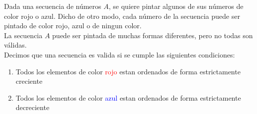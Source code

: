 Dada una secuencia de números $A$, se quiere pintar algunos de sus números de color rojo o azul. Dicho de otro modo, cada número de la secuencia puede ser pintado de color rojo, azul o de ningun color. \\

La secuencia $A$ puede ser pintada de muchas formas diferentes, pero no todas son válidas. \\ 
Decimos que una secuencia es valida si se cumple las siguientes condiciones:
\begin{enumerate}
\item Todos los elementos de color \textcolor{red}{rojo} estan ordenados de forma estrictamente creciente 
\item Todos los elementos de color \textcolor{blue}{azul} estan ordenados de forma estrictamente decreciente 
\end{enumerate}

